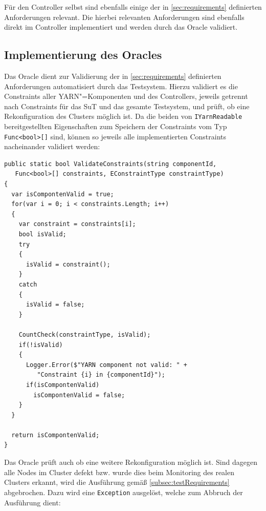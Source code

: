 Für den Controller selbst sind ebenfalls einige der in \cref{sec:requirements} definierten Anforderungen relevant.
Die hierbei relevanten Anforderungen sind ebenfalls direkt im Controller implementiert und werden durch das Oracle validiert.

\subsection{Implementierung des Oracles}
\label{subsec:oracleImpl}

Das Oracle dient zur Validierung der  in \cref{sec:requirements} definierten Anforderungen automatisiert durch das Testsystem.
Hierzu validiert es die Constraints aller \gls{YARN}"=Komponenten und des Controllers, jeweils getrennt nach Constraints für das \gls{SuT} und das gesamte Testsystem, und prüft, ob eine Rekonfiguration des Clusters möglich ist.
Da die beiden von \texttt{IYarnReadable} bereitgestellten Eigenschaften zum Speichern der Constraints vom Typ \texttt{Func<bool>[]} sind, können so jeweils alle implementierten Constraints nacheinander validiert werden:

\begin{lstlisting}[label=lst:oracleValidateConstraints,style=cs,
caption={[Validieren der Constraints durch das Oracle]
    Validieren der Constraints durch das Oracle.
    Die zu validierenden Constraints werden im Parameter \texttt{constraints} übergeben, der Parameter \texttt{constraintType} dient zu statistischen Zwecken in \texttt{CountCheck()}.}]
public static bool ValidateConstraints(string componentId,
   Func<bool>[] constraints, EConstraintType constraintType)
{
  var isCompontenValid = true;
  for(var i = 0; i < constraints.Length; i++)
  {
    var constraint = constraints[i];
    bool isValid;
    try
    {
      isValid = constraint();
    }
    catch
    {
      isValid = false;
    }
    
    CountCheck(constraintType, isValid);
    if(!isValid)
    {
      Logger.Error($"YARN component not valid: " +
         "Constraint {i} in {componentId}");
      if(isCompontenValid)
        isCompontenValid = false;
    }
  }
  
  return isCompontenValid;
}
\end{lstlisting}

Das Oracle prüft auch ob eine weitere Rekonfiguration möglich ist.
Sind dagegen alle Nodes im Cluster defekt bzw. wurde dies beim Monitoring des realen Clusters erkannt, wird die Ausführung gemäß \cref{subsec:testRequirements} abgebrochen.
Dazu wird eine \texttt{Exception} ausgelöst, welche zum Abbruch der Ausführung dient:

